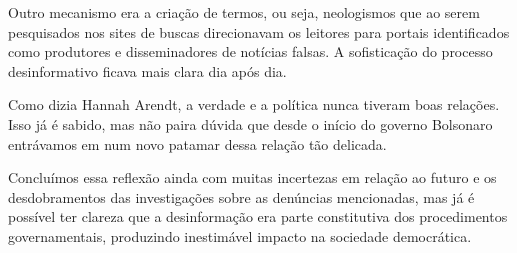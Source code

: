 Outro mecanismo era a criação de termos, ou seja, neologismos que ao
serem pesquisados nos sites de buscas direcionavam os leitores para
portais identificados como produtores e disseminadores de notícias
falsas. A sofisticação do processo desinformativo ficava mais clara dia
após dia.

Como dizia Hannah Arendt, a verdade e a política nunca tiveram boas
relações. Isso já é sabido, mas não paira dúvida que desde o início do
governo Bolsonaro entrávamos em num novo patamar dessa relação tão
delicada.

Concluímos essa reflexão ainda com muitas incertezas em relação ao
futuro e os desdobramentos das investigações sobre as denúncias
mencionadas, mas já é possível ter clareza que a desinformação era parte
constitutiva dos procedimentos governamentais, produzindo inestimável
impacto na sociedade democrática.

